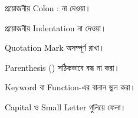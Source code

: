 

\begin{compacttwocolpoints}

\item প্রয়োজনীয় Colon
\textenglish{\ttfamily :}
না দেওয়া।

\item প্রয়োজনীয় Indentation না দেওয়া।

\item Quotation Mark অসম্পূর্ণ রাখা।

\item Parenthesis
\textenglish{\ttfamily ()}
সঠিকভাবে বন্ধ না করা।

\item Keyword বা Function-এর বানান ভুল করা।

\item Capital ও Small Letter গুলিয়ে ফেলা।

\end{compacttwocolpoints}



